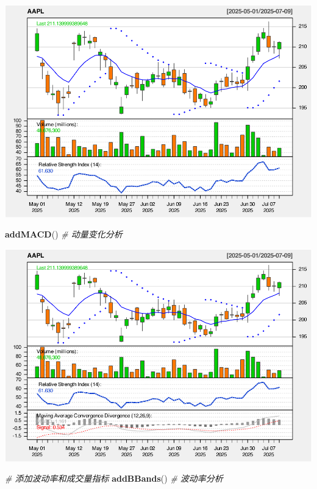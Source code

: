 \documentclass[]{ctexbook}
\newenvironment{Shaded}{\begin{snugshade}}{\end{snugshade}}
\newcommand{\CommentTok}[1]{\textcolor[rgb]{0.56,0.35,0.01}{\textit{#1}}}
\newcommand{\FunctionTok}[1]{\textcolor[rgb]{0.13,0.29,0.53}{\textbf{#1}}}
\newcommand{\NormalTok}[1]{#1}
\begin{document}
\includegraphics[width=0.9\linewidth]{quantmod_files/figure-latex/comprehensive-5}

\begin{Shaded}
\begin{Highlighting}[]
\FunctionTok{addMACD}\NormalTok{()  }\CommentTok{\# 动量变化分析}
\end{Highlighting}
\end{Shaded}

\includegraphics[width=0.9\linewidth]{quantmod_files/figure-latex/comprehensive-6}

\begin{Shaded}
\begin{Highlighting}[]
\CommentTok{\# 添加波动率和成交量指标}
\FunctionTok{addBBands}\NormalTok{()  }\CommentTok{\# 波动率分析}
\end{Highlighting}
\end{Shaded}
\end{document}
